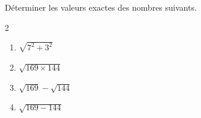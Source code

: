 \begin{exo}{}
	Déterminer les valeurs exactes des nombres suivants.
	\vspace*{-2mm}\begin{multicols}{2}
		\begin{enumerate}[itemsep=2mm]
			\item $\sqrt{7^2 + 3^2}$
			\item $\sqrt{169 \times 144}$
			\item $\sqrt{169} - \sqrt{144}$
			\item $\sqrt{169 - 144}$
		\end{enumerate}
	\end{multicols}
\end{exo}
